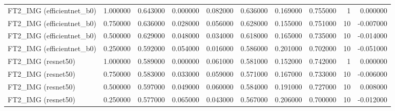 \begin{table}
\begin{tabular}{lrrrrrrrrr}
FT2\_IMG (efficientnet\_b0) & 1.000000 & 0.643000 & 0.000000 & 0.082000 & 0.636000 & 0.169000 & 0.755000 & 1 & 0.000000 \\
FT2\_IMG (efficientnet\_b0) & 0.750000 & 0.636000 & 0.028000 & 0.056000 & 0.628000 & 0.155000 & 0.751000 & 10 & -0.007000 \\
FT2\_IMG (efficientnet\_b0) & 0.500000 & 0.629000 & 0.048000 & 0.034000 & 0.618000 & 0.165000 & 0.735000 & 10 & -0.014000 \\
FT2\_IMG (efficientnet\_b0) & 0.250000 & 0.592000 & 0.054000 & 0.016000 & 0.586000 & 0.201000 & 0.702000 & 10 & -0.051000 \\
FT2\_IMG (resnet50) & 1.000000 & 0.589000 & 0.000000 & 0.061000 & 0.581000 & 0.152000 & 0.742000 & 1 & 0.000000 \\
FT2\_IMG (resnet50) & 0.750000 & 0.583000 & 0.033000 & 0.059000 & 0.571000 & 0.167000 & 0.733000 & 10 & -0.006000 \\
FT2\_IMG (resnet50) & 0.500000 & 0.597000 & 0.049000 & 0.060000 & 0.584000 & 0.191000 & 0.727000 & 10 & 0.008000 \\
FT2\_IMG (resnet50) & 0.250000 & 0.577000 & 0.065000 & 0.043000 & 0.567000 & 0.206000 & 0.700000 & 10 & -0.012000 \\
\bottomrule
\end{tabular}
\end{table}
